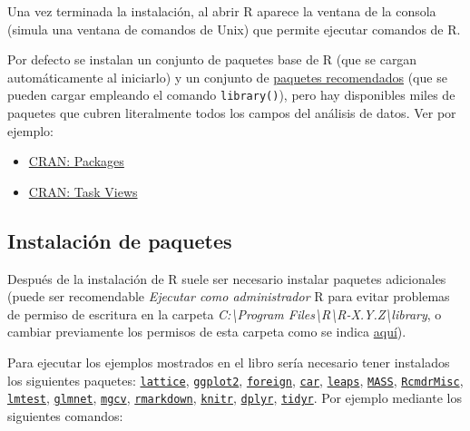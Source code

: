 \documentclass[
]{book}
\theoremstyle{break}
\theoremstyle{nonumberplain}
\begin{document}
Una vez terminada la instalación, al abrir R aparece la ventana de la consola (simula una ventana de comandos de Unix) que permite ejecutar comandos de R.

Por defecto se instalan un conjunto de paquetes base de R (que se cargan automáticamente al iniciarlo) y un conjunto de \href{https://cran.r-project.org/src/contrib/4.1.2/Recommended}{paquetes recomendados} (que se pueden cargar empleando el comando \texttt{library()}),
pero hay disponibles miles de paquetes que cubren literalmente todos los campos del análisis de datos.
Ver por ejemplo:

\begin{itemize}
\item
  \href{https://cran.r-project.org/web/packages/index.html}{CRAN: Packages}
\item
  \href{https://cran.r-project.org/web/views}{CRAN: Task Views}
\end{itemize}

\hypertarget{paquetes-win}{%
\subsection{Instalación de paquetes}\label{paquetes-win}}

Después de la instalación de R suele ser necesario instalar paquetes adicionales (puede ser recomendable \emph{Ejecutar como administrador} R para evitar problemas de permiso de escritura en la carpeta \emph{C:\textbackslash Program Files\textbackslash R\textbackslash R-X.Y.Z\textbackslash library}, o cambiar previamente los permisos de esta carpeta como se indica \protect\hyperlink{library}{aquí}).

Para ejecutar los ejemplos mostrados en el libro sería necesario tener instalados los siguientes paquetes:
\href{https://CRAN.R-project.org/package=lattice}{\texttt{lattice}}, \href{https://CRAN.R-project.org/package=ggplot2}{\texttt{ggplot2}}, \href{https://CRAN.R-project.org/package=foreign}{\texttt{foreign}}, \href{https://CRAN.R-project.org/package=car}{\texttt{car}}, \href{https://CRAN.R-project.org/package=leaps}{\texttt{leaps}}, \href{https://CRAN.R-project.org/package=MASS}{\texttt{MASS}}, \href{https://CRAN.R-project.org/package=RcmdrMisc}{\texttt{RcmdrMisc}}, \href{https://CRAN.R-project.org/package=lmtest}{\texttt{lmtest}}, \href{https://CRAN.R-project.org/package=glmnet}{\texttt{glmnet}}, \href{https://CRAN.R-project.org/package=mgcv}{\texttt{mgcv}}, \href{https://CRAN.R-project.org/package=rmarkdown}{\texttt{rmarkdown}}, \href{https://CRAN.R-project.org/package=knitr}{\texttt{knitr}}, \href{https://CRAN.R-project.org/package=dplyr}{\texttt{dplyr}}, \href{https://CRAN.R-project.org/package=tidyr}{\texttt{tidyr}}.
Por ejemplo mediante los siguientes comandos:
\end{document}
